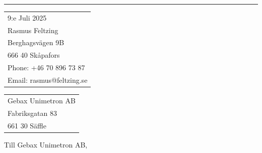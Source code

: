\documentclass{article}
\begin{document}


\vspace{-1em} %

\rule{\linewidth}{1pt} %

\bigskip\bigskip %


\hfill
\begin{tabular}{l @{}}
	9:e Juli 2025 \bigskip\\ %
	Rasmus Feltzing \\
	Berghagsvägen 9B \\ %
	666 40 Skåpafors \\
	Phone: +46 70 896 73 87 \\
	Email: rasmus@feltzing.se
\end{tabular}

\bigskip %


\begin{tabular}{@{} l}
	Gebax Unimetron AB\\
	Fabriksgatan 83\\
	661 30 Säffle
\end{tabular}

\bigskip %

Till Gebax Unimetron AB,

\bigskip %


\end{document}
